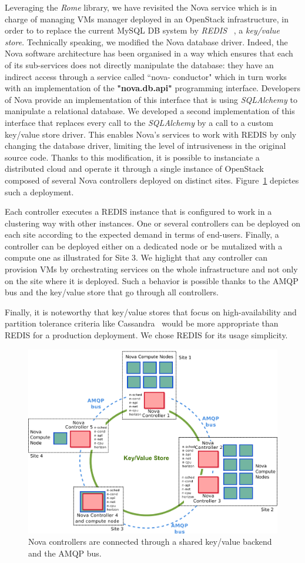 Leveraging the \textit{Rome} library, we have revisited the Nova service which
is in charge of managing VMs manager deployed in an OpenStack infrastructure, in
order to to replace the current MySQL DB system by \textit{REDIS}
~\cite{han:2011}, a \textit{key/value store}. Technically speaking, we modified
the Nova database driver. Indeed, the  Nova software architecture has been
organised in a way which ensures that each of its sub-services does not directly
manipulate the database: they have an indirect access through a service called
``nova- conductor" which in turn works with an implementation of the
\textbf{"nova.db.api"} programming interface. Developers of Nova provide an
implementation of this interface that is using \textit{SQLAlchemy} to manipulate
a relational database. We developed a second implementation of this interface
that replaces every call to the \textit{SQLAlchemy} by a call to a custom
key/value store driver.  This enables  Nova's services to work with REDIS by
only changing the database driver, limiting the level of intrusiveness in the
original source code. Thanks to this modification, it is possible to instanciate
a distributed cloud and operate it through a single instance of OpenStack
composed of several Nova controllers deployed on distinct sites.
Figure~\ref{fig:newnova} depictes such a deployment.

Each controller executes a REDIS instance that is configured to work in a
clustering way with other instances. One or several controllers can be deployed
on each site according to the expected demand in terms of end-users. Finally, a
controller can be deployed either on a dedicated node or be mutalized with a
compute one as illustrated for Site 3. We higlight that any controller can
provision VMs by orchestrating services on the whole infrastructure and not only
on the site where it is deployed. Such a behavior is possible thanks to the AMQP
bus and the key/value store that go through all controllers.

Finally, it is noteworthy that key/value stores that focus on high-availability
and partition tolerance criteria like Cassandra~\cite{lakshman:2010} would be
more appropriate than REDIS for a production deployment. We chose REDIS for its
usage simplicity.

\begin{figure}[htbp]
        \centering
\vspace*{-.4cm}        \hspace*{-.2cm}\includegraphics[width=.51\textwidth]{figures/OpenStack_distributed.pdf}
        \caption{Nova controllers are connected through a shared key/value backend
        and the AMQP bus.}
      \label{fig:newnova}
\vspace*{-.3cm}
\end{figure}

